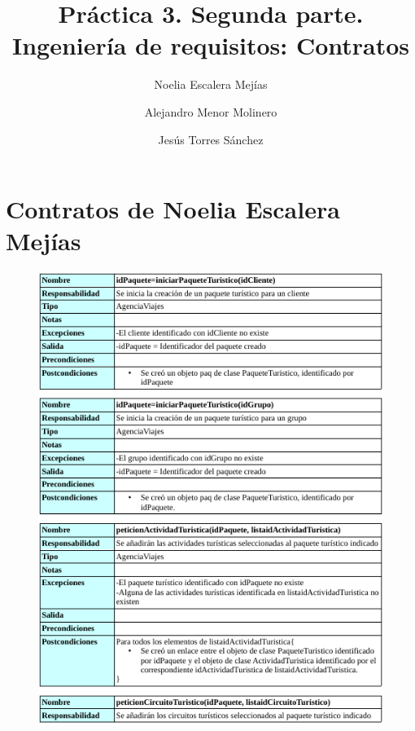 \documentclass{article}
\title{Práctica 3. Segunda parte. Ingeniería de requisitos: Contratos}
\author{Noelia Escalera Mejías\\
	\and Alejandro Menor Molinero\\
	\and Jesús Torres Sánchez}
\begin{document}
	\maketitle
	
	\section{Contratos de Noelia Escalera Mejías}
	\begin{figure}[H]
		\centering
		\includegraphics[totalheight=12cm]{pag1}
	\end{figure}
	
	
	
	
\end{document}
